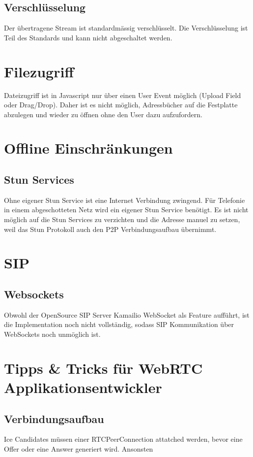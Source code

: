 		\subsection{Verschlüsselung}
			Der übertragene Stream ist standardmässig verschlüsselt. Die Verschlüsselung ist Teil des Standards und kann nicht abgeschaltet werden.
	 	
	 
	 \section{Filezugriff}
	 	Dateizugriff ist in Javascript nur über einen User Event möglich (Upload Field oder Drag/Drop). Daher ist es nicht möglich, Adressbücher auf die Festplatte abzulegen und wieder zu öffnen ohne den User dazu aufzufordern.
	 	
	 
	 \section{Offline Einschränkungen}
	 	\subsection{Stun Services}
			Ohne eigener Stun Service ist eine Internet Verbindung zwingend. Für Telefonie in einem abgeschotteten Netz wird ein eigener Stun Service benötigt. Es ist nicht möglich auf die Stun Services zu verzichten und die Adresse manuel zu setzen, weil das Stun Protokoll auch den P2P Verbindungsaufbau übernimmt.
	 	
	 		
	 \section{SIP}
	 	\subsection{Websockets}
	 		Obwohl der OpenSource SIP Server Kamailio WebSocket als Feature aufführt, ist die Implementation noch nicht vollständig, sodass SIP Kommunikation über WebSockets noch unmöglich ist.


	\section{Tipps \& Tricks für WebRTC Applikationsentwickler}
		\subsection{Verbindungsaufbau}
			Ice Candidates müssen einer RTCPeerConnection attatched werden, bevor eine Offer oder eine Answer generiert wird. Ansonsten